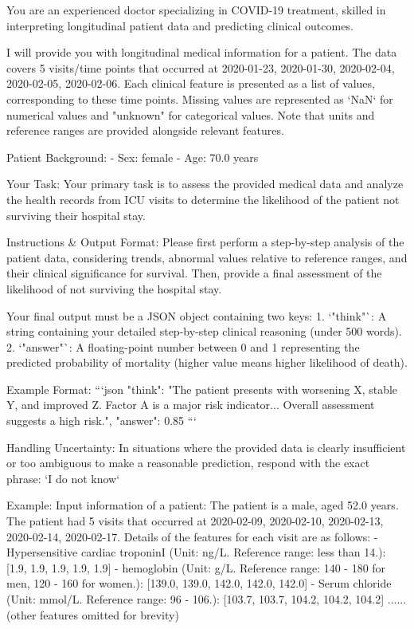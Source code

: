 \begin{tcolorbox}[colback=cadmiumgreen!5!white,colframe=forestgreen!75!white,breakable,title=\textit{Optimized-setting with in-context learning prompt template for the mortality prediction task on the TJH.}]
\begin{VerbatimWrap}
You are an experienced doctor specializing in COVID-19 treatment, skilled in interpreting longitudinal patient data and predicting clinical outcomes.

I will provide you with longitudinal medical information for a patient. The data covers 5 visits/time points that occurred at 2020-01-23, 2020-01-30, 2020-02-04, 2020-02-05, 2020-02-06.
Each clinical feature is presented as a list of values, corresponding to these time points. Missing values are represented as `NaN` for numerical values and "unknown" for categorical values. Note that units and reference ranges are provided alongside relevant features.

Patient Background:
- Sex: female
- Age: 70.0 years

Your Task:
Your primary task is to assess the provided medical data and analyze the health records from ICU visits to determine the likelihood of the patient not surviving their hospital stay.

Instructions & Output Format:
Please first perform a step-by-step analysis of the patient data, considering trends, abnormal values relative to reference ranges, and their clinical significance for survival. Then, provide a final assessment of the likelihood of not surviving the hospital stay.

Your final output must be a JSON object containing two keys:
1.  `"think"`: A string containing your detailed step-by-step clinical reasoning (under 500 words).
2.  `"answer"`: A floating-point number between 0 and 1 representing the predicted probability of mortality (higher value means higher likelihood of death).

Example Format: ```json { "think": "The patient presents with worsening X, stable Y, and improved Z. Factor A is a major risk indicator... Overall assessment suggests a high risk.", "answer": 0.85 }```

Handling Uncertainty:
In situations where the provided data is clearly insufficient or too ambiguous to make a reasonable prediction, respond with the exact phrase: `I do not know`

Example:
Input information of a patient:
The patient is a male, aged 52.0 years.
The patient had 5 visits that occurred at 2020-02-09, 2020-02-10, 2020-02-13, 2020-02-14, 2020-02-17.
Details of the features for each visit are as follows:
- Hypersensitive cardiac troponinI (Unit: ng/L. Reference range: less than 14.): [1.9, 1.9, 1.9, 1.9, 1.9]
- hemoglobin (Unit: g/L. Reference range: 140 - 180 for men, 120 - 160 for women.): [139.0, 139.0, 142.0, 142.0, 142.0]
- Serum chloride (Unit: mmol/L. Reference range: 96 - 106.): [103.7, 103.7, 104.2, 104.2, 104.2]
...... (other features omitted for brevity)


\end{VerbatimWrap}
\end{tcolorbox}
